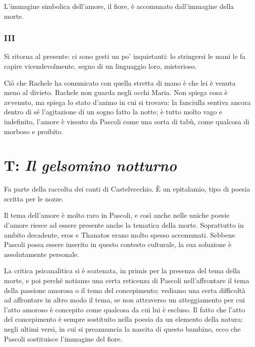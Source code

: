 L'immagine simbolica dell'amore, il fiore, è accomunato dall'immagine della morte.

\subsection{III}

Si ritorna al presente: ci sono gesti un po' inquietanti: lo stringersi le mani le fa capire vicendevolmente, segno di un linguaggio loro, misterioso.


Ciò che Rachele ha comunicato con quella stretta di mano è che lei è venuta meno al divieto. Rachele non guarda negli occhi Maria.
Non spiega cosa è avvenuto, ma spiega lo stato d'animo in cui si trovava: la fanciulla sentiva ancora dentro di sé l'agitazione di un sogno fatto la notte; è tutto molto vago e indefinito, l'amore è vissuto da Pascoli come una sorta di tabù, come qualcosa di morboso e proibito.


\chapter{T: \textit{Il gelsomino notturno}}

Fa parte della raccolta dei canti di Castelvecchio.
È un epitalamio, tipo di poesia scritta per le nozze.

Il tema dell'amore è molto raro in Pascoli, e così anche nelle uniche poesie d'amore riesce ad essere presente anche la tematica della morte.
Soprattutto in ambito decadente, eros e Thanatos erano molto spesso accomunati. Sebbene Pascoli possa essere inserito in questo contesto culturale, la sua soluzione è assolutamente personale.

La critica psicanalitica si è scatenata, in primis per la presenza del tema della morte, e poi perché notiamo una certa reticenza di Pascoli nell'affrontare il tema della passione amorosa o il tema del concepimento; vediamo una certa difficoltà ad affrontare in altro modo il tema, se non attraverso un atteggiamento per cui l'atto amoroso è concepito come qualcosa da cui lui è escluso.
Il fatto che l'atto del concepimento è sempre sostituito nella poesia da un elemento della natura: negli ultimi versi, in cui si preannuncia la nascita di questo bambino, ecco che Pascoli sostituisce l'immagine del fiore.

